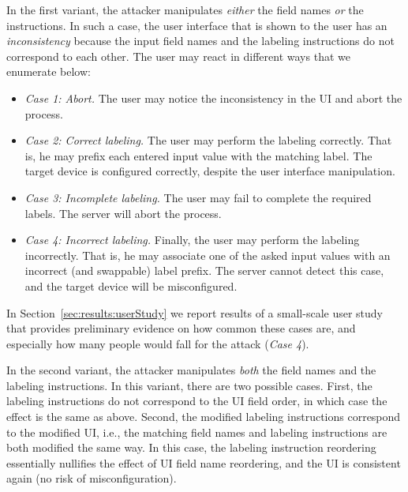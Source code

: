 \label{sec:securityAnalysis_IK:cases}
In the first variant, the attacker manipulates \emph{either} the field names \emph{or} the instructions. In such a case, the user interface that is shown to the user has an \emph{inconsistency} because the input field names and the labeling instructions do not correspond to each other. The user may react in different ways that we enumerate below:
\begin{itemize}
    \item \emph{Case 1: Abort.} The user may notice the inconsistency in the UI and abort the process. \label{detect}
    
    \item \emph{Case 2: Correct labeling.} The user may perform the labeling correctly. That is, he may prefix each entered input value with the matching label. The target device is configured correctly, despite the user interface manipulation.\label{notdetect}
    
    
    \item \emph{Case 3: Incomplete labeling.} The user may fail to complete the required labels. The server will abort the process. 
    
    \item \emph{Case 4: Incorrect labeling.} Finally, the user may perform the labeling incorrectly. That is, he may associate one of the asked input values with an incorrect (and swappable) label prefix. The server cannot detect this case, and the target device will be misconfigured. \label{kaboom}
\end{itemize}

In Section~\ref{sec:results:userStudy} we report results of a small-scale user study that provides preliminary evidence on how common these cases are, and especially how many people would fall for the attack (\emph{Case 4}).


In the second variant, the attacker manipulates \emph{both} the field names and the labeling instructions. In this variant, there are two possible cases. First, the labeling instructions do not correspond to the UI field order, in which case the effect is the same as above. Second, the modified labeling instructions correspond to the modified UI, i.e., the matching field names and labeling instructions are both modified the same way. In this case, the labeling instruction reordering essentially nullifies the effect of UI field name reordering, and the UI is consistent again (no risk of misconfiguration).


